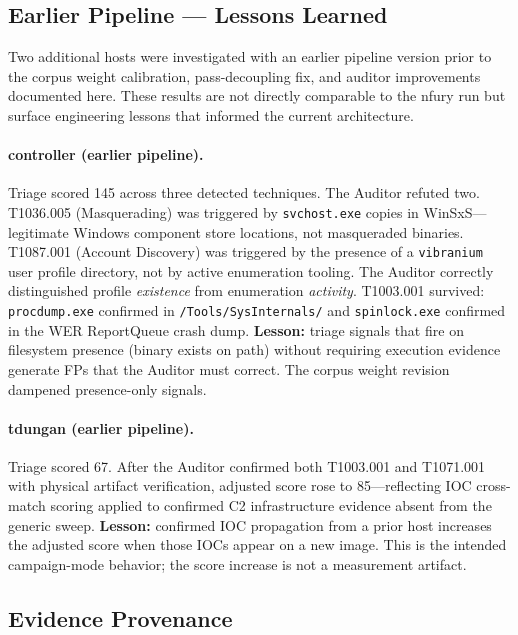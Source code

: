 \documentclass[sigconf, nonacm]{acmart}
\begin{document}
\subsection{Earlier Pipeline — Lessons Learned}
\label{sec:lessons}

Two additional hosts were investigated with an earlier pipeline version
prior to the corpus weight calibration, pass-decoupling fix, and
auditor improvements documented here. These results are not directly
comparable to the nfury run but surface engineering lessons that
informed the current architecture.

\paragraph{controller (earlier pipeline).}
Triage scored 145 across three detected techniques. The Auditor refuted
two. T1036.005 (Masquerading) was triggered by \texttt{svchost.exe}
copies in WinSxS---legitimate Windows component store locations, not
masqueraded binaries. T1087.001 (Account Discovery) was triggered by
the presence of a \texttt{vibranium} user profile directory, not by
active enumeration tooling. The Auditor correctly distinguished profile
\emph{existence} from enumeration \emph{activity}. T1003.001 survived:
\texttt{procdump.exe} confirmed in \texttt{/Tools/SysInternals/} and
\texttt{spinlock.exe} confirmed in the WER ReportQueue crash dump.
\textbf{Lesson:} triage signals that fire on filesystem presence (binary
exists on path) without requiring execution evidence generate FPs that
the Auditor must correct. The corpus weight revision dampened
presence-only signals.

\paragraph{tdungan (earlier pipeline).}
Triage scored 67. After the Auditor confirmed both T1003.001 and
T1071.001 with physical artifact verification, adjusted score rose
to 85---reflecting IOC cross-match scoring applied to confirmed C2
infrastructure evidence absent from the generic sweep.
\textbf{Lesson:} confirmed IOC propagation from a prior host
increases the adjusted score when those IOCs appear on a new image.
This is the intended campaign-mode behavior; the score increase is
not a measurement artifact.

\subsection{Evidence Provenance}
\end{document}
